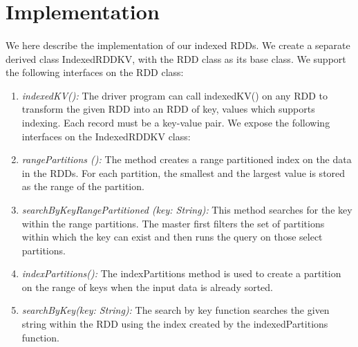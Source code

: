 \section{Implementation} 
\label{sec:implementation}
\paragraph{}
We here describe the implementation of our indexed RDDs. We create a separate derived class IndexedRDDKV, with the RDD class as its base class. We support the following interfaces on the RDD class:
\begin{enumerate}
\item \textit{indexedKV():} The driver program can call indexedKV() on any RDD to transform the given RDD into an RDD of key, values which supports indexing. Each record must be a key-value pair. 
We expose the following interfaces on the IndexedRDDKV class:
\item \textit{rangePartitions ():} The method creates a range partitioned index on the data in the RDDs. For each partition, the smallest and the largest value is stored as the range of the partition.
\item \textit{searchByKeyRangePartitioned (key: String):} This method searches for the key within the range partitions. The master first filters the set of partitions within which the key can exist and then runs the query on those select partitions. 
\item \textit{indexPartitions():} The indexPartitions method is used to create a partition on the range of keys when the input data is already sorted. 
\item \textit{searchByKey(key: String):} The search by key function searches the given string within the RDD using the index created by the indexedPartitions function. 
\end{enumerate}